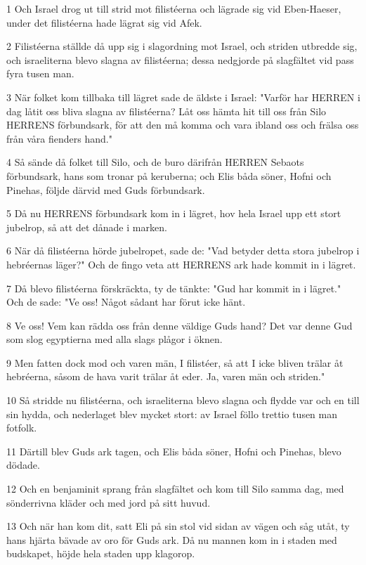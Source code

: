 \par 1 Och Israel drog ut till strid mot filistéerna och lägrade sig vid Eben-Haeser, under det filistéerna hade lägrat sig vid Afek.
\par 2 Filistéerna ställde då upp sig i slagordning mot Israel, och striden utbredde sig, och israeliterna blevo slagna av filistéerna; dessa nedgjorde på slagfältet vid pass fyra tusen man.
\par 3 När folket kom tillbaka till lägret sade de äldste i Israel: "Varför har HERREN i dag låtit oss bliva slagna av filistéerna? Låt oss hämta hit till oss från Silo HERRENS förbundsark, för att den må komma och vara ibland oss och frälsa oss från våra fienders hand."
\par 4 Så sände då folket till Silo, och de buro därifrån HERREN Sebaots förbundsark, hans som tronar på keruberna; och Elis båda söner, Hofni och Pinehas, följde därvid med Guds förbundsark.
\par 5 Då nu HERRENS förbundsark kom in i lägret, hov hela Israel upp ett stort jubelrop, så att det dånade i marken.
\par 6 När då filistéerna hörde jubelropet, sade de: "Vad betyder detta stora jubelrop i hebréernas läger?" Och de fingo veta att HERRENS ark hade kommit in i lägret.
\par 7 Då blevo filistéerna förskräckta, ty de tänkte: "Gud har kommit in i lägret." Och de sade: "Ve oss! Något sådant har förut icke hänt.
\par 8 Ve oss! Vem kan rädda oss från denne väldige Guds hand? Det var denne Gud som slog egyptierna med alla slags plågor i öknen.
\par 9 Men fatten dock mod och varen män, I filistéer, så att I icke bliven trälar åt hebréerna, såsom de hava varit trälar åt eder. Ja, varen män och striden."
\par 10 Så stridde nu filistéerna, och israeliterna blevo slagna och flydde var och en till sin hydda, och nederlaget blev mycket stort: av Israel föllo trettio tusen man fotfolk.
\par 11 Därtill blev Guds ark tagen, och Elis båda söner, Hofni och Pinehas, blevo dödade.
\par 12 Och en benjaminit sprang från slagfältet och kom till Silo samma dag, med sönderrivna kläder och med jord på sitt huvud.
\par 13 Och när han kom dit, satt Eli på sin stol vid sidan av vägen och såg utåt, ty hans hjärta bävade av oro för Guds ark. Då nu mannen kom in i staden med budskapet, höjde hela staden upp klagorop.
